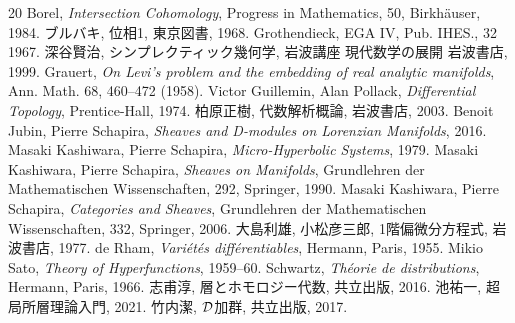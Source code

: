 \begin{thebibliography}{20} 
     Borel, 
        \textit{Intersection Cohomology}, 
        Progress in Mathematics, 50, Birkh\"auser, 1984.
     ブルバキ, 位相1, 東京図書, 1968.
     Grothendieck, EGA IV, Pub. IHES., 32 1967.
     深谷賢治, シンプレクティック幾何学, 岩波講座 現代数学の展開 岩波書店, 1999.
     Grauert, 
        \textit{On Levi's problem and the embedding of real analytic manifolds}, 
        Ann. Math. 68, 460--472 (1958).
     Victor Guillemin, Alan Pollack, 
        \textit{Differential Topology}, 
        Prentice-Hall, 1974.
     柏原正樹, 代数解析概論, 岩波書店, 2003.
     Benoit Jubin, Pierre Schapira, 
        \textit{Sheaves and D-modules on Lorenzian Manifolds}, 2016.
     Masaki Kashiwara, Pierre Schapira, 
        \textit{Micro-Hyperbolic Systems}, 
        1979.
     Masaki Kashiwara, Pierre Schapira, 
        \textit{Sheaves on Manifolds}, 
        Grundlehren der Mathematischen Wissenschaften, 292, Springer, 1990.
     Masaki Kashiwara, Pierre Schapira, 
        \textit{Categories and Sheaves}, 
        Grundlehren der Mathematischen Wissenschaften, 332, Springer, 2006.
     大島利雄, 小松彦三郎, 1階偏微分方程式, 岩波書店, 1977.
     de Rham, 
        \textit{Vari\'et\'es diff\'erentiables}, 
        Hermann, Paris, 1955.
     Mikio Sato, 
        \textit{Theory of Hyperfunctions}, 
        1959--60.
     Schwartz, 
        \textit{Th\'eorie de distributions}, 
        Hermann, Paris, 1966.
     志甫淳, 層とホモロジー代数, 共立出版, 2016.
     池祐一, 超局所層理論入門, 2021.
     竹内潔, \(\mathcal{D}\)加群, 共立出版, 2017.
\end{thebibliography}




